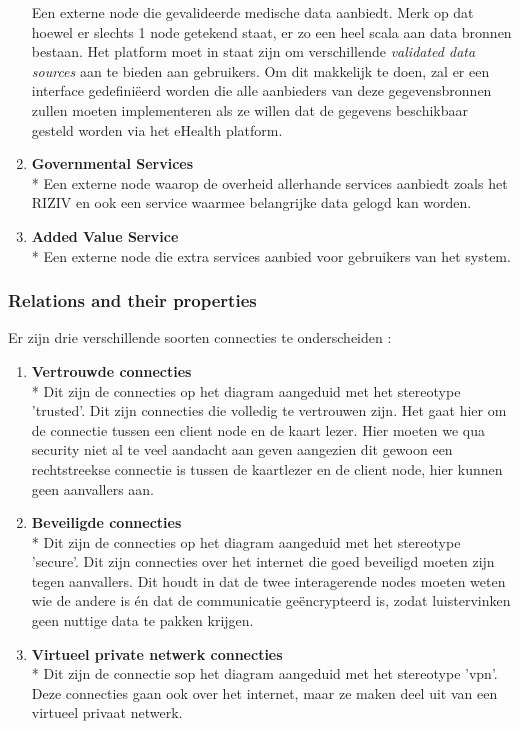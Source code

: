 \documentclass[a4paper,10pt]{article}
\begin{document}
\begin{enumerate}
Een externe node die gevalideerde medische data aanbiedt. Merk op dat hoewel er slechts 1 node getekend staat, er zo een heel scala aan data bronnen bestaan. Het platform moet in staat zijn om verschillende \textit{validated data sources} aan te bieden aan gebruikers. Om dit makkelijk te doen, zal er een interface gedefiniëerd worden die alle aanbieders van deze gegevensbronnen zullen moeten implementeren als ze willen dat de gegevens beschikbaar gesteld worden via het eHealth platform.
\item \textbf{Governmental Services}\\*
Een externe node waarop de overheid allerhande services aanbiedt zoals het RIZIV en ook een service waarmee belangrijke data gelogd kan worden.
\item \textbf{Added Value Service}\\*
Een externe node die extra services aanbied voor gebruikers van het system.
\end{enumerate}

\subsubsection{Relations and their properties}
\label{subsubsec:relations_deployment}
Er zijn drie verschillende soorten connecties te onderscheiden : 
\begin{enumerate}
 \item \textbf{Vertrouwde connecties}\\*
Dit zijn de connecties op het diagram aangeduid met het stereotype 'trusted'. Dit zijn connecties die volledig te vertrouwen zijn. Het gaat hier om de connectie tussen een client node en de kaart lezer. Hier moeten we qua security niet al te veel aandacht aan geven aangezien dit gewoon een rechtstreekse connectie is tussen de kaartlezer en de client node, hier kunnen geen aanvallers aan. 
\item \textbf{Beveiligde connecties}\\*
Dit zijn de connecties op het diagram aangeduid met het stereotype 'secure'. Dit zijn connecties over het internet die goed beveiligd moeten zijn tegen aanvallers. Dit houdt in dat de twee interagerende nodes moeten weten wie de andere is én dat de communicatie geëncrypteerd is, zodat luistervinken geen nuttige data te pakken krijgen.
\item \textbf{Virtueel private netwerk connecties}\\*
Dit zijn de connectie sop het diagram aangeduid met het stereotype 'vpn'. Deze connecties gaan ook over het internet, maar ze maken deel uit van een virtueel privaat netwerk.
\end{enumerate}
\end{document}
